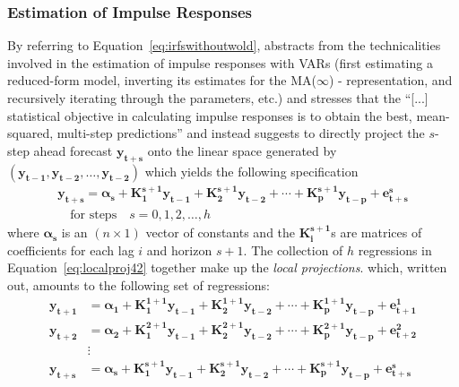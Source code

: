 \documentclass[a4paper,11pt,listof=nochaptergap,oneside,pointednumbers,bibtotoc,bigheadings,liststotoc]{scrbook}
\renewcommand*{\paragraph}[1]{\subsubsection*{#1} \vspace{-3mm}} %
\newcommand{\vect}[1]{\boldsymbol{\mathbf{#1}}}
\begin{document}
\paragraph{Estimation of Impulse Responses}
By referring to Equation~\ref{eq:irfswithoutwold}, \citet[p. 4]{jorda:05} abstracts from the technicalities involved in the estimation of impulse responses with VARs (first estimating a reduced-form model, inverting its estimates for the MA($\infty$) - representation, and recursively iterating through the parameters, etc.) and stresses that the ``[...] statistical objective in calculating impulse responses is to obtain the best, mean-squared, multi-step predictions'' and instead suggests to directly project the $s$-step ahead forecast $\vect{y_{t+s}}$ onto the linear space generated by $(\vect{y_{t-1}}, \vect{y_{t-2}}, \dots, \vect{y_{t-2}})$ which yields the following specification
\begin{equation} \label{eq:localproj42}
\begin{split}
	\vect{y_{t+s}} = \vect{\alpha_s} + \vect{K_1^{s+1}}\vect{y_{t-1}} + \vect{K_2^{s+1}}\vect{y_{t-2}} + \cdots + \vect{K_p^{s+1}}\vect{y_{t-p}} + \vect{e_{t+s}^s} \\
	\quad \text{for steps} \quad s=0, 1, 2, \dots, h 
\end{split}								
\end{equation}
where $\vect{\alpha_s}$ is an $(n \times 1)$ vector of constants and the $\vect{K_i^{s+1}}$s are matrices of coefficients for each lag $i$ and horizon $s+1$. The collection of $h$ regressions in Equation~\ref{eq:localproj42} together make up the \textit{local projections}. which, written out, amounts to the following set of regressions:
\begin{equation} \label{eq:localproj43}
\begin{split}
	\vect{y_{t+1}} & = \vect{\alpha_1} + \vect{K_1^{1+1}}\vect{y_{t-1}} + \vect{K_2^{1+1}}\vect{y_{t-2}} + \cdots + \vect{K_p^{1+1}}\vect{y_{t-p}} + \vect{e_{t+1}^1} \\
	\vect{y_{t+2}} & = \vect{\alpha_2} + \vect{K_1^{2+1}}\vect{y_{t-1}} + \vect{K_2^{2+1}}\vect{y_{t-2}} + \cdots + \vect{K_p^{2+1}}\vect{y_{t-p}} + \vect{e_{t+2}^2} \\
	& \vdots \\
	\vect{y_{t+s}} & = \vect{\alpha_s} + \vect{K_1^{s+1}}\vect{y_{t-1}} + \vect{K_2^{s+1}}\vect{y_{t-2}} + \cdots + \vect{K_p^{s+1}}\vect{y_{t-p}} + \vect{e_{t+s}^s}
\end{split}								
\end{equation}
\end{document}
